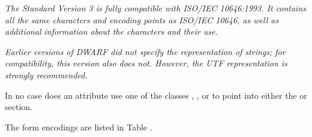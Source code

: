 \begin{itemize}
\textit{The  Standard Version 3 is fully compatible with
ISO/IEC 10646:1993. It contains all the same characters
and encoding points as ISO/IEC 10646, as well as additional
information about the characters and their use.}

\textit{Earlier versions of DWARF did not specify the representation
of strings; for compatibility, this version also does
not. However, the UTF representation is strongly recommended.}

\end{itemize}

In no case does an attribute use 
one 
of 
the 
classes ,
,  or 
 to point into either the
\dotdebuginfo{} or \dotdebugstr{} section.

The form encodings are listed in 
Table .


